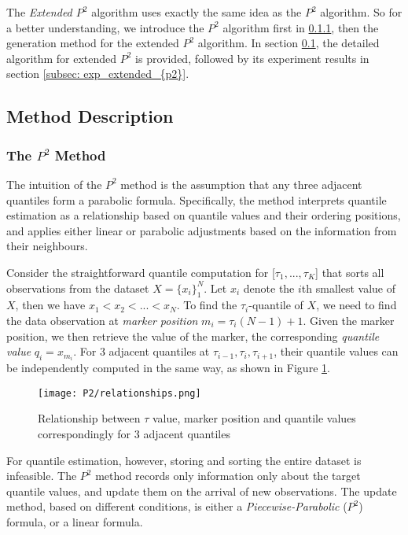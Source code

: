 The \textit{Extended $P^2$} algorithm\cite{raatikainenSequentialProcedureSimultaneous1993} uses exactly the same idea as the $P^2$ algorithm\cite{jainP2AlgorithmDynamic1985}. So for a better understanding, we introduce the $P^2$ algorithm first in \ref{subsubsec: description_{p2}}, then the generation method for the extended $P^2$ algorithm.
In section \ref{subsec: algo_extended_{p2}}, the detailed algorithm for extended $P^2$ is provided, followed by its experiment results in section \ref{subsec: exp_extended_{p2}}.

\subsection{Method Description}
\label{subsec: algo_extended_{p2}}
\subsubsection{The $P^2$ Method}
\label{subsubsec: description_{p2}}

The intuition of the $P^2$ method is the assumption that any three adjacent quantiles form a parabolic formula.
Specifically, the method interprets quantile estimation as a relationship based on quantile values and their ordering positions, and applies either linear or parabolic adjustments based on the information from their neighbours.

Consider the straightforward quantile computation for [$\tau_1, ..., \tau_K$] that sorts all observations from the dataset $X = \{x_i\}^N_1$. Let $x_i$ denote the $i$th smallest value of $X$, then we have $x_1 < x_2 < ... < x_N$. 
To find the $\tau_i$-quantile of $X$, we need to find the data observation at \textit{marker position} $m_i = \tau_i (N-1) + 1$. Given the marker position, we then retrieve the value of the marker, the corresponding \textit{quantile value} $q_i = x_{m_i}$. 
For 3 adjacent quantiles at $\tau_{i-1}, \tau_i, \tau_{i+1}$, their quantile values can be independently computed in the same way, as shown in Figure \ref{fig: {multi_relationship_p2}}.

\begin{figure}[h]
    \centering
	\texttt{[image: P2/relationships.png]}
    \caption{Relationship between $\tau$ value, marker position and quantile values correspondingly for 3 adjacent quantiles}
    \label{fig: {multi_relationship_p2}}
\end{figure}

For quantile estimation, however, storing and sorting the entire dataset is infeasible. The $P^2$ method records only information only about the target quantile values, and update them on the arrival of new observations. The update method, based on different conditions, is either a \textit{Piecewise-Parabolic} ($P^2$) formula, or a linear formula.

